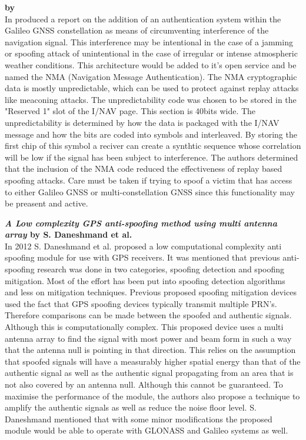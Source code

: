 \textbf{\emph{} by \citeauthor{RN37}} \\
In \citeyear{RN37} \citeauthor{RN37} \cite{RN37} produced a report on the addition of an authentication system within the Galileo GNSS constellation as means of
circumventing interference of the navigation signal. This interference may be intentional in the case of a jamming or spoofing attack of unintentional in the case of
irregular or intense atmospheric weather conditions. This architecture would be added to it's open service and be named the NMA (Navigation Message Authentication). The
NMA cryptographic data is mostly unpredictable, which can be used to protect against replay attacks like meaconing attacks. The unpredictability code was chosen to be
stored in the "Reserved 1" slot of the I/NAV page. This section is 40bits wide. The unpredictability is determined by how the data is packaged with the I/NAV message and
how the bits are coded into symbols and interleaved. By storing the first chip of this symbol a reciver can  create a synthtic sequence whose correlation will be low if
the signal has been subject to interference. The authors determined that the inclusion of the NMA code reduced the effectiveness of replay based spoofing attacks.
Care must be taken if trying to spoof a victim that has access to either Galileo GNSS or multi-constellation GNSS since this functionality may be preasent and active. 

\medskip

\textbf{\emph{A Low complexity GPS anti-spoofing method using multi antenna array} by S. Daneshmand et al.} \\
In 2012 S. Daneshmand et al.\cite{RN8} proposed a low computational complexity anti spoofing module for use with GPS receivers.
It was mentioned that previous anti-spoofing research was done in two categories, spoofing detection and spoofing mitigation.
Most of the effort has been put into spoofing detection algorithms and less on mitigation techniques. 
Previous proposed spoofing mitigation devices used the fact that GPS spoofing devices typically transmit multiple PRN's. 
Therefore comparisons can be made between the spoofed and authentic signals. Although this is computationally complex. This proposed
device uses a multi antenna array to find the signal with most power and beam form in such a way that the antenna null is pointing in
that direction. This relies on the assumption that spoofed signals will have a measurably higher spatial energy than that of the authentic signal
as well as the authentic signal propagating from an area that is not also covered by an antenna null. Although this cannot be guaranteed.
To maximise the performance of the module, the authors also propose a technique to amplify the authentic signals as well as reduce the noise floor level.
S. Daneshmand mentioned that with some minor modifications the proposed module would be able to operate with GLONASS and Galileo systems as well. 

